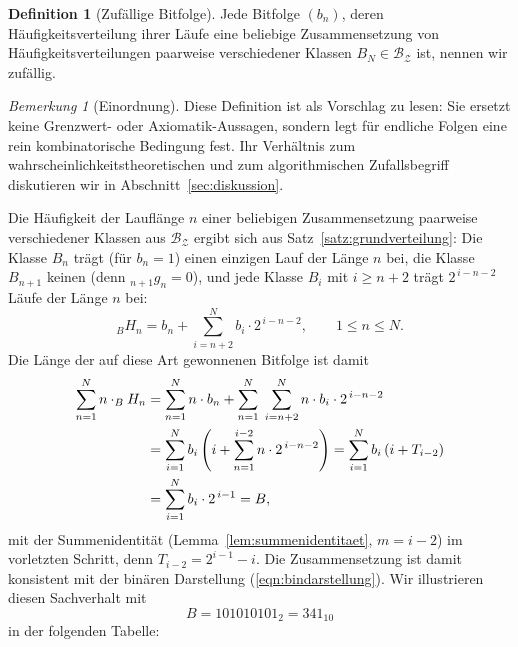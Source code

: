 \documentclass[11pt,a4paper]{scrartcl}
\theoremstyle{plain}
\theoremstyle{definition}
\newtheorem{defi}[satz]{Definition}
\theoremstyle{remark}
\newtheorem{bem}[satz]{Bemerkung}
\begin{document}
\begin{defi}[Zufällige Bitfolge]\label{defi:zufaellig}
Jede Bitfolge $(b_n)$, deren Häufigkeitsverteilung ihrer Läufe eine
beliebige Zusammensetzung von Häufigkeitsverteilungen paarweise
verschiedener Klassen $B_N \in \mathcal{B_Z}$ ist, nennen wir
zufällig.
\end{defi}
\begin{bem}[Einordnung]\label{bem:einordnung}
Diese Definition ist als Vorschlag zu lesen: Sie ersetzt keine
Grenzwert- oder Axiomatik-Aussagen, sondern legt für endliche Folgen
eine rein kombinatorische Bedingung fest. Ihr Verhältnis zum
wahrscheinlichkeitstheoretischen und zum algorithmischen
Zufallsbegriff diskutieren wir in Abschnitt~\ref{sec:diskussion}.
\end{bem}

Die Häufigkeit der Lauflänge $n$ einer beliebigen Zusammensetzung
paarweise verschiedener Klassen aus $\mathcal{B_Z}$ ergibt sich aus Satz~\ref{satz:grundverteilung}: Die Klasse $B_n$ trägt
(für $b_n=1$) einen einzigen Lauf der Länge $n$ bei, die Klasse
$B_{n+1}$ keinen (denn $_{n+1}g_n=0$), und jede Klasse $B_i$ mit
$i\geq n+2$ trägt $2^{\,i-n-2}$ Läufe der Länge $n$ bei:
\begin{equation}\label{eqn:hnformel}
  _BH_n=b_n+\sum_{i=n+2}^{N} b_{i}\cdot 2^{\,i-n-2},\qquad 1\leq n\leq N.
\end{equation}
Die Länge der auf diese Art gewonnenen Bitfolge ist damit
\begin{align}
  \sum_{n=1}^{N} n\cdot _BH_n
  &= \sum_{n=1}^{N} n\cdot b_n+\sum_{n=1}^{N}\;\sum_{i=n+2}^{N}
     n\cdot b_{i}\cdot 2^{\,i-n-2}\notag\\
  &= \sum_{i=1}^{N} b_i\left(i+\sum_{n=1}^{i-2} n\cdot 2^{\,i-n-2}\right)
   = \sum_{i=1}^{N} b_i\left(i+T_{i-2}\right)\notag\\
  &= \sum_{i=1}^{N} b_i\cdot 2^{\,i-1}=B,\label{eqn:laengekonsistenz}
\end{align}
mit der Summenidentität (Lemma~\ref{lem:summenidentitaet}, $m=i-2$) im
vorletzten Schritt, denn $T_{i-2}=2^{i-1}-i$. Die Zusammensetzung ist
damit konsistent mit der binären Darstellung
(\ref{eqn:bindarstellung}). Wir illustrieren diesen Sachverhalt mit
\begin{equation}
  B=101010101_2=341_{10}
\end{equation}
in der folgenden Tabelle:
\end{document}
